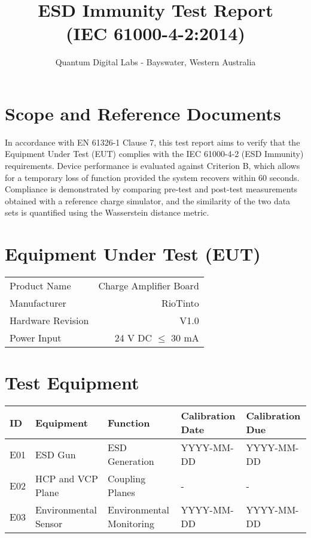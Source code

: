 \documentclass[a4paper,12pt]{article}
\title{\bfseries ESD Immunity Test Report\\[2mm]
        (IEC 61000-4-2:2014)}
\author{Quantum Digital Labs - Bayswater, Western Australia}
\begin{document}
\maketitle
\thispagestyle{empty}
\newpage
\tableofcontents
\newpage

\section{Scope and Reference Documents}
In accordance with EN 61326-1 Clause 7, this test report aims to verify that the Equipment Under Test (EUT) complies with the IEC 61000-4-2 (ESD Immunity) requirements. Device performance is evaluated against Criterion B, which allows for a temporary loss of function provided the system recovers within 60 seconds. Compliance is demonstrated by comparing pre-test and post-test measurements obtained with a reference charge simulator, and the similarity of the two data sets is quantified using the Wasserstein distance metric.

\section{Equipment Under Test (EUT)}
\begin{table}[h]
\centering
\begin{tabular}{L R}
      Product Name & Charge Amplifier Board \\
      Manufacturer & RioTinto \\
      Hardware Revision & V1.0 \\
      Power Input & 24 V DC $\leq$ 30 mA \\
\end{tabular}
\end{table}

\section{Test Equipment}
\begin{table}[h]
\centering
\begin{tabular}{|l|l|l|l|l|}
      ID & Equipment & Function & Calibration Date & Calibration Due \\
      \hline
      E01 & ESD Gun & ESD Generation & YYYY-MM-DD & YYYY-MM-DD\\
      E02 & HCP and VCP Plane & Coupling Planes & - & - \\
      E03 & Environmental Sensor & Environmental Monitoring & YYYY-MM-DD & YYYY-MM-DD \\
\end{tabular}
\end{table}
\end{document}
